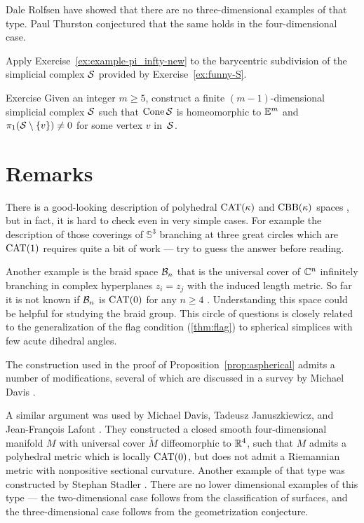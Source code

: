 Dale Rolfsen \cite{rolfsen} have showed that there are no three-dimensional examples of that type.
Paul Thurston \cite{thurston} conjectured that the same holds in the four-dimensional case.

Apply Exercise~\ref{ex:example-pi_infty-new} to the barycentric subdivision of the simplicial complex $\mathcal{S}$ provided by Exercise~\ref{ex:funny-S}.
\qeds

\begin{thm}{Exercise}\label{ex:funny-S}
Given an integer $m\ge 5$,
construct a finite $(m-1)$-dimensional simplicial complex $\mathcal{S}$ such that $\mathop{\rm Cone}\nolimits\mathcal{S}$ is homeomorphic to $\mathbb{E}^m$
and $\pi_1(\mathcal{S}\setminus\{v\})\ne0$ for some vertex $v$ in~$\mathcal{S}$.
\end{thm} 

\section{Remarks}

There is a good-looking description of polyhedral $\mathrm{CAT}(\kappa)$ and $\mathrm{CBB}(\kappa)$ spaces \cite[12.2 and 12.5]{alexander-kapovitch-petrunin-2025},
but in fact, it is hard to check even in very simple cases.
For example the description of those coverings of $\mathbb{S}^3$ branching at three 
great circles which are $\mathrm{CAT}(1)$ requires quite a bit of work \cite{charney-davis-1993} --- try to guess the answer before reading.

Another example is the braid space $\mathcal{B}_n$ that  is the universal cover of $\mathbb{C}^n$ infinitely branching in complex hyperplanes $z_i=z_j$ with the induced length metric.
So far it is not known if $\mathcal{B}_n$ is $\mathrm{CAT}(0)$ for any $n\ge 4$ \cite{panov-petrunin-2016}.
Understanding this space could be helpful for studying the braid group.
This circle of questions is closely related to the generalization of the flag condition (\ref{thm:flag}) to  spherical simplices with few acute dihedral angles.


The construction used in the proof of  Proposition~\ref{prop:aspherical} admits a number of modifications,  
several of which are discussed in a survey by Michael Davis \cite{davis-2001}.

A similar argument was used by Michael Davis, 
Tadeusz Ja\-nu\-szkie\-wicz,
and  Jean-Fran\c{c}ois Lafont \cite{davis-januszkiewicz-lafont}.
They constructed a closed smooth four-dimensional manifold $M$ with  universal cover $\tilde M$ diffeomorphic to $\mathbb{R}^4$, such that $M$ admits a polyhedral metric which is locally $\mathrm{CAT}(0)$, but does not admit a Riemannian metric with nonpositive sectional curvature.
Another example of that type was constructed by Stephan Stadler \cite{stadler}.
There are no lower dimensional examples of this type ---
the two-dimensional case follows from the  classification of surfaces,
and 
the three-dimensional case follows from the geometrization conjecture.

